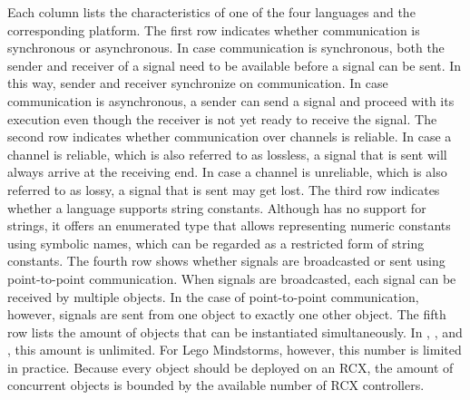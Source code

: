 Each column lists the characteristics of one of the four languages and the corresponding platform.
The first row indicates whether communication is synchronous or asynchronous.
In case communication is synchronous, both the sender and receiver of a signal need to be available before a signal can be sent.
In this way, sender and receiver synchronize on communication.
In case communication is asynchronous, a sender can send a signal and proceed with its execution even though the receiver is not yet ready to receive the signal.
The second row indicates whether communication over channels is reliable.
In case a channel is reliable, which is also referred to as lossless, a signal that is sent will always arrive at the receiving end.
In case a channel is unreliable, which is also referred to as lossy, a signal that is sent may get lost.
The third row indicates whether a language supports string constants.
Although \Promela has no support for strings, it offers an enumerated type that allows representing numeric constants using symbolic names, which can be regarded as a restricted form of string constants.
The fourth row shows whether signals are broadcasted or sent using point-to-point communication.
When signals are broadcasted, each signal can be received by multiple objects.
In the case of point-to-point communication, however, signals are sent from one object to exactly one other object.
The fifth row lists the amount of objects that can be instantiated simultaneously.
In \POOSL, \Promela, and \SLCO, this amount is unlimited.
For Lego Mindstorms, however, this number is limited in practice.
Because every object should be deployed on an RCX, the amount of concurrent objects is bounded by the available number of RCX controllers.
